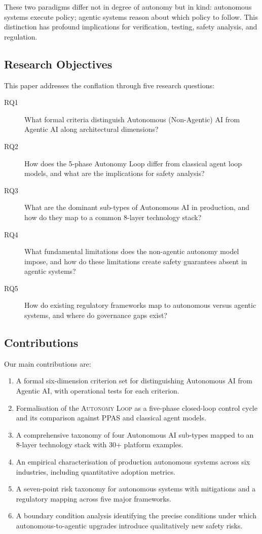\documentclass[12pt, a4paper]{article}
\begin{document}
These two paradigms differ not in degree of autonomy but in kind: autonomous systems execute policy; agentic systems reason about which policy to follow. This distinction has profound implications for verification, testing, safety analysis, and regulation.

\subsection{Research Objectives}
This paper addresses the conflation through five research questions:

\begin{description}
    \item[RQ1] What formal criteria distinguish Autonomous (Non-Agentic) AI from Agentic AI along architectural dimensions?
    \item[RQ2] How does the 5-phase Autonomy Loop differ from classical agent loop models, and what are the implications for safety analysis?
    \item[RQ3] What are the dominant sub-types of Autonomous AI in production, and how do they map to a common 8-layer technology stack?
    \item[RQ4] What fundamental limitations does the non-agentic autonomy model impose, and how do these limitations create safety guarantees absent in agentic systems?
    \item[RQ5] How do existing regulatory frameworks map to autonomous versus agentic systems, and where do governance gaps exist?
\end{description}

\subsection{Contributions}
Our main contributions are:
\begin{enumerate}
    \item A formal six-dimension criterion set for distinguishing Autonomous AI from Agentic AI, with operational tests for each criterion.
    \item Formalisation of the \textsc{Autonomy Loop} as a five-phase closed-loop control cycle and its comparison against PPAS and classical agent models.
    \item A comprehensive taxonomy of four Autonomous AI sub-types mapped to an 8-layer technology stack with 30+ platform examples.
    \item An empirical characterisation of production autonomous systems across six industries, including quantitative adoption metrics.
    \item A seven-point risk taxonomy for autonomous systems with mitigations and a regulatory mapping across five major frameworks.
    \item A boundary condition analysis identifying the precise conditions under which autonomous-to-agentic upgrades introduce qualitatively new safety risks.
\end{enumerate}
\end{document}
